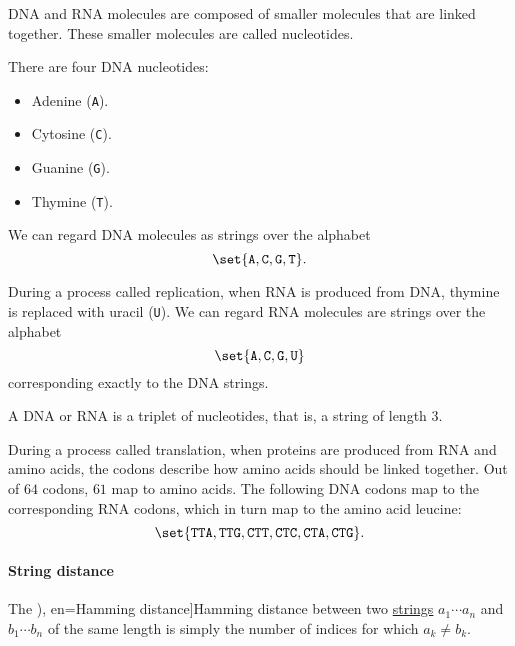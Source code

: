 \begin{example}
\begin{thmenum}
     DNA and RNA molecules are composed of smaller molecules that are linked together. These smaller molecules are called nucleotides.

    There are four DNA nucleotides:
    \begin{itemize}
      \item Adenine (\texttt{A}).
      \item Cytosine (\texttt{C}).
      \item Guanine (\texttt{G}).
      \item Thymine (\texttt{T}).
    \end{itemize}

    We can regard DNA molecules as strings over the alphabet
    \begin{equation*}
      \set{ \texttt{A}, \texttt{C}, \texttt{G}, \texttt{T} }.
    \end{equation*}

    During a process called replication, when RNA is produced from DNA, thymine is replaced with uracil (\texttt{U}). We can regard RNA molecules are strings over the alphabet
    \begin{equation*}
      \set{ \texttt{A}, \texttt{C}, \texttt{G}, \texttt{U} }
    \end{equation*}
    corresponding exactly to the DNA strings.

    A DNA or RNA  is a triplet of nucleotides, that is, a string of length \( 3 \).

    During a process called translation, when proteins are produced from RNA and amino acids, the codons describe how amino acids should be linked together. Out of \( 64 \) codons, \( 61 \) map to amino acids. The following DNA codons map to the corresponding RNA codons, which in turn map to the amino acid leucine:
    \begin{equation*}
       \set{ \texttt{TTA}, \texttt{TTG}, \texttt{CTT}, \texttt{CTC}, \texttt{CTA}, \texttt{CTG} }.
    \end{equation*}
  \end{thmenum}
\end{example}

\paragraph{String distance}

\begin{definition}\label{def:hamming_distance}
  The \term[ru=расстояние Хэмминга (\cite[\S 6.3.3]{Новиков2013ДискретнаяМатематика}), en=Hamming distance]{Hamming distance} between two \hyperref[def:formal_language/string]{strings} \( a_1 \cdots a_n \) and \( b_1 \cdots b_n \) of the same length is simply the number of indices for which \( a_k \neq b_k \).
\end{definition}

